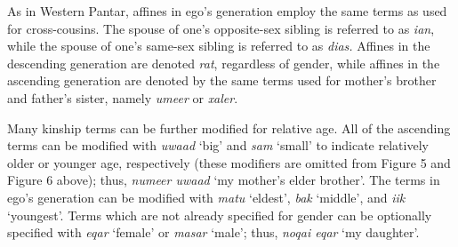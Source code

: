 As in Western Pantar, affines in ego's generation employ the same terms as used for cross-cousins. The spouse of one's opposite-sex sibling is referred to as \textit{ian}, while the spouse of one's same-sex sibling is referred to as \textit{dias.} Affines in the descending generation are denoted \textit{rat}, regardless of gender, while affines in the ascending generation are denoted by the same terms used for mother's brother and father's sister, namely \textit{umeer} or \textit{xaler}.

Many kinship terms can be further modified for relative age. All of the ascending terms can be modified with \textit{uwaad} `big' and \textit{sam} `small' to indicate relatively older or younger age, respectively (these modifiers are omitted from Figure 5 and Figure 6 above); thus, \textit{numeer uwaad} `my mother's elder brother'. The terms in ego's generation can be modified with \textit{matu} `eldest', \textit{bak} `middle', and \textit{iik} `youngest'.  Terms which are not already specified for gender can be optionally specified with \textit{eqar} `female' or \textit{masar} `male'; thus, \textit{noqai eqar} `my daughter'.




